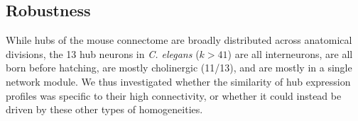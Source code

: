 \documentclass[10pt,letterpaper]{article}
\begin{document}
\subsection*{Robustness}
While hubs of the mouse connectome are broadly distributed across anatomical divisions, the 13 hub neurons in \emph{C. elegans} ($k > 41$) are all interneurons, are all born before hatching, are mostly cholinergic (11/13), and are mostly in a single network module.
We thus investigated whether the similarity of hub expression profiles was specific to their high connectivity, or whether it could instead be driven by these other types of homogeneities.


\end{document}
